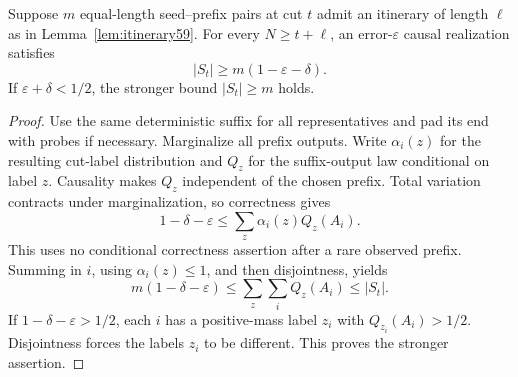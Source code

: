 \begin{lemma}\label{lem:testingcut59}
Suppose $m$ equal-length seed--prefix pairs at cut $t$ admit an itinerary
of length $\ell$ as in Lemma~\ref{lem:itinerary59}. For every
$N\ge t+\ell$, an error-$\varepsilon$ causal realization satisfies
\begin{equation}\label{eq:testingcut59}
                  |S_t|\ge m(1-\varepsilon-\delta).
\end{equation}
If $\varepsilon+\delta<1/2$, the stronger bound $|S_t|\ge m$ holds.
\end{lemma}
\begin{proof}
Use the same deterministic suffix for all representatives and pad its
end with probes if necessary. Marginalize all prefix outputs. Write
$\alpha_i(z)$ for the resulting cut-label distribution and $Q_z$ for
the suffix-output law conditional on label $z$. Causality makes $Q_z$
independent of the chosen prefix. Total variation contracts under
marginalization, so correctness gives
\[
 1-\delta-\varepsilon
     \le\sum_z\alpha_i(z)Q_z(A_i).
\]
This uses no conditional correctness assertion after a rare observed
prefix. Summing in $i$, using $\alpha_i(z)\le1$, and then disjointness,
yields
\[
 m(1-\delta-\varepsilon)
 \le\sum_z\sum_iQ_z(A_i)\le |S_t|.
\]
If $1-\delta-\varepsilon>1/2$, each $i$ has a positive-mass label $z_i$
with $Q_{z_i}(A_i)>1/2$. Disjointness forces the labels $z_i$ to be
different. This proves the stronger assertion.
\end{proof}

